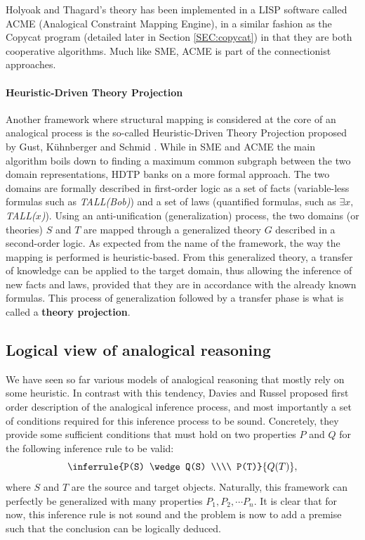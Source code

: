 Holyoak and Thagard's theory has been implemented in a LISP software called
ACME (Analogical Constraint Mapping Engine), in a similar fashion as the
Copycat program (detailed later in Section \ref{SEC:copycat}) in that they are
both cooperative algorithms. Much like SME, ACME is part of the connectionist
approaches.

\paragraph{Heuristic-Driven Theory Projection\\}

Another framework where structural mapping is considered at the core of an
analogical process is the so-called Heuristic-Driven Theory Projection proposed
by Gust, K\"uhnberger and Schmid \cite{GusKunSchTCS06}. While in SME and ACME
the main algorithm boils down to finding a maximum common subgraph between the
two domain representations, HDTP banks on a more formal approach. The two
domains are formally described in first-order logic as a set of facts
(variable-less formulas such as \textit{TALL(Bob)}) and a set of laws
(quantified formulas, such as \textit{$\exists x,$ TALL($x$)}). Using an
anti-unification (generalization) process, the two domains (or theories) $S$
and $T$ are mapped through a generalized theory $G$ described in a second-order
logic. As expected from the name of the framework, the way the mapping is
performed is heuristic-based. From this generalized theory, a transfer of
knowledge can be applied to the target domain, thus allowing the inference of
new facts and laws, provided that they are in accordance with the already known
formulas.  This process of generalization followed by a transfer phase is what
is called a \textbf{theory projection}.

\subsection{Logical view of analogical reasoning}
\label{SEC:Davies_and_Russel}

We have seen so far various models of analogical reasoning that mostly rely on
some heuristic. In contrast with this tendency, Davies and Russel
\cite{DavRus87} proposed first order description of the analogical inference
process, and most importantly a set of conditions required for this inference
process to be sound.  Concretely, they provide some sufficient conditions that
must hold on two properties $P$ and $Q$ for the following inference rule to be
valid:
$$\inferrule{P(S) \wedge Q(S) \\\\ P(T)}{Q(T)},$$
where $S$ and $T$ are the source and target objects. Naturally, this framework
can perfectly be generalized with many properties $P_1, P_2, \cdots P_n$. It is
clear that for now, this inference rule is not sound and the problem is now to
add a premise such that the conclusion can be logically deduced.

